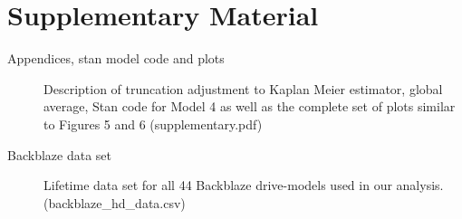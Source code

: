 \documentclass[11pt]{article}
\newcommand{\op}{\operatorname}
\begin{document}
\clearpage




\section*{Supplementary Material}
\label{sec:supple}

\begin{description}

\item[Appendices, stan model code and plots] Description of truncation adjustment to Kaplan Meier estimator, global average, Stan code for Model 4 as well as the complete set of plots similar to Figures 5 and 6 (supplementary.pdf)

\item[Backblaze data set] Lifetime data set for all 44 Backblaze drive-models used in our analysis. (backblaze\_hd\_data.csv)

\end{description}

%




\end{document}
